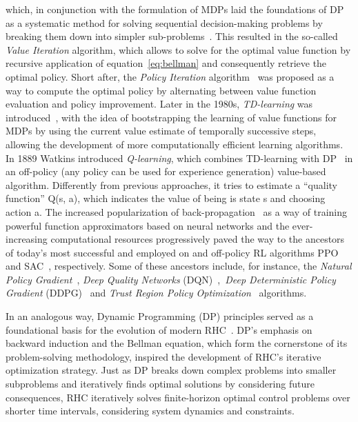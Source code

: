 which, in conjunction with the formulation of MDPs laid the foundations of DP as a systematic method for solving sequential decision-making problems by breaking them down into simpler sub-problems~\cite{rl:bellman1960dynamic}. This resulted in the so-called \textit{Value Iteration} algorithm, which allows to solve for the optimal value function by recursive application of equation~\eqref{eq:bellman} and consequently retrieve the optimal policy. Short after, the \textit{Policy Iteration} algorithm~\cite{rl:howard1960dynamic} was proposed as a way to compute the optimal policy by alternating between value function evaluation and policy improvement. Later in the 1980s, \textit{TD-learning} was introduced~\cite{rl:barto1983neuronlike}, with the idea of bootstrapping the learning of value functions for MDPs by
using the current value estimate of temporally successive steps, allowing the development of more computationally efficient learning algorithms. In 1889 Watkins introduced \textit{Q-learning}, which combines TD-learning with DP~\cite{rl:watkins1989learning} in an off-policy (any policy can be used for experience generation) value-based algorithm. Differently from previous approaches, it tries to estimate a ``quality function'' Q(s, a), which indicates the value of being is state s and choosing action a. The increased popularization of back-propagation~\cite{rl:rumelhart1986learning} as a way of training powerful function approximators based on neural networks and the ever-increasing computational resources progressively paved the way to the ancestors of today's most successful and employed on and off-policy RL algorithms PPO~\cite{rl:schulman2017proximal} and SAC~\cite{rl:haarnoja2018soft}, respectively. Some of these ancestors include, for instance, the \textit{Natural Policy Gradient}~\cite{rl:kakade2001natural}, \textit{Deep Quality Networks} (DQN)~\cite{rl:mnih2015human},~\textit{Deep Deterministic Policy Gradient} (DDPG)~\cite{rl:lillicrap2015continuous} and \textit{Trust Region Policy Optimization}~\cite{rl:schulman2015trust} algorithms.

In an analogous way, Dynamic Programming (DP) principles served as a foundational basis for the evolution of modern RHC~\cite{modern_mpc:grandia2023perceptive}.
DP's emphasis on backward induction and the Bellman equation, which form the cornerstone of its problem-solving methodology, inspired the development of RHC's iterative optimization strategy. Just as DP breaks down complex problems into smaller subproblems and iteratively finds optimal solutions by considering future consequences, RHC iteratively solves finite-horizon optimal control problems over shorter time intervals, considering system dynamics and constraints. 

